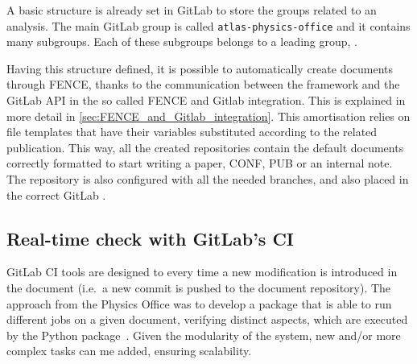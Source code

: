 A basic structure is already set in GitLab to store the groups related to an analysis.
The main GitLab group is called \texttt{atlas-physics-office} and it contains many subgroups. Each of these subgroups belongs to a leading group, .

Having this structure defined, it is possible to automatically create documents through FENCE, thanks to the communication between the framework and the GitLab API in the so called FENCE and Gitlab integration.
This is explained in more detail in \cref{sec:FENCE_and_Gitlab_integration}.
This amortisation relies on file templates that have their variables substituted according to the related publication.
This way, all the created repositories contain the default documents correctly formatted to start writing a paper, CONF, PUB or an internal note.
The repository is also configured with all the needed branches,
 and also placed in the correct GitLab .


\subsection{Real-time check with GitLab’s CI}%
\label{sec:Real-time_check_with GitLabs_CI}

GitLab CI tools are designed to  every time a new modification is introduced in the document (i.e.\ a new commit is pushed to the document repository).
The approach from the Physics Office was to develop a package that is able to run different jobs on a given document, verifying distinct aspects, which are executed by the \pogitlab Python package~\cite{pogitlab-repo}.
Given the modularity of the system, new and/or more complex tasks can me added, ensuring scalability.


